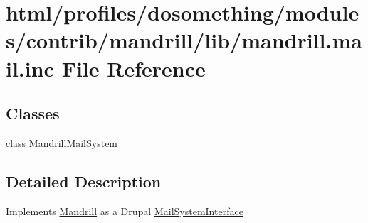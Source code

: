 \hypertarget{mandrill_8mail_8inc}{
\section{html/profiles/dosomething/modules/contrib/mandrill/lib/mandrill.mail.inc File Reference}
\label{mandrill_8mail_8inc}
}
\subsection*{Classes}
\begin{DoxyCompactItemize}
\item 
class \hyperlink{classMandrillMailSystem}{MandrillMailSystem}
\end{DoxyCompactItemize}


\subsection{Detailed Description}
Implements \hyperlink{classMandrill}{Mandrill} as a Drupal \hyperlink{interfaceMailSystemInterface}{MailSystemInterface} 